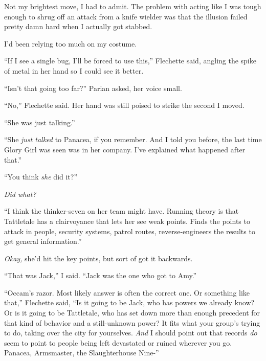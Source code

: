 





Not my brightest move, I had to admit.  The problem with acting like I was tough enough to shrug off an attack from a knife wielder was that the illusion failed pretty damn hard when I actually got stabbed.



I'd been relying too much on my costume.



``If I see a single bug, I'll be forced to use this,'' Flechette said, angling the spike of metal in her hand so I could see it better.



``Isn't that going too far?'' Parian asked, her voice small.



``No,'' Flechette said.  Her hand was still poised to strike the second I moved.



``She was just talking.''



``She \emph{just talked} to Panacea, if you remember.  And I told you before, the last time Glory Girl was seen was in her company.  I've explained what happened after that.''



``You think \emph{she} did it?''



\emph{Did what?}



``I think the thinker-seven on her team might have.  Running theory is that Tattletale has a clairvoyance that lets her see weak points.  Finds the points to attack in people, security systems, patrol routes, reverse-engineers the results to get general information.''



\emph{Okay, }she'd hit the key points, but sort of got it backwards.



``That was Jack,'' I said.  ``Jack was the one who got to Amy.''



``Occam's razor.  Most likely answer is often the correct one.  Or something like that,'' Flechette said,  ``Is it going to be Jack, who has powers we already know?  Or is it going to be Tattletale, who has set down more than enough precedent for that kind of behavior and a still-unknown power?  It fits what your group's trying to do, taking over the city for yourselves.  \emph{And} I should point out that records \emph{do }seem to point to people being left devastated or ruined wherever you go.  Panacea, Armsmaster, the Slaughterhouse Nine-''



